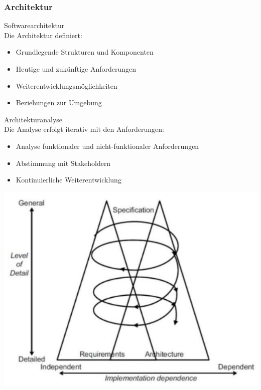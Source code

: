 \columnbreak

\subsubsection{Architektur}

\begin{definition}{Softwarearchitektur}\\
Die Architektur definiert:
\begin{itemize}
    \item Grundlegende Strukturen und Komponenten
    \item Heutige und zukünftige Anforderungen
    \item Weiterentwicklungsmöglichkeiten
    \item Beziehungen zur Umgebung
\end{itemize}
\end{definition}

\begin{concept}{Architekturanalyse}\\
Die Analyse erfolgt iterativ mit den Anforderungen:
\begin{itemize}
    \item Analyse funktionaler und nicht-funktionaler Anforderungen
    \item Abstimmung mit Stakeholdern
    \item Kontinuierliche Weiterentwicklung
\end{itemize}
\includegraphics[width=0.9\linewidth]{images/2024_12_29_0d1d7b5551ea1b4b41bdg-08}
\end{concept}



